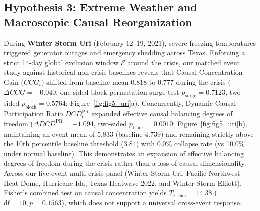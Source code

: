 \documentclass[10pt,twocolumn,journal]{article}
\begin{document}
\subsection{Hypothesis 3: Extreme Weather and Macroscopic Causal Reorganization}
During \textbf{Winter Storm Uri} (February 12--19, 2021), severe freezing temperatures triggered generator outages and emergency shedding across Texas. Enforcing a strict 14-day global exclusion window $\mathcal{E}$ around the crisis, our matched event study against historical non-crisis baselines reveals that Causal Concentration Gain ($CCG_t$) shifted from baseline mean $0.818$ to $0.777$ during the crisis ($\Delta CCG = -0.040$, one-sided block permutation surge test $p_{\text{surge}} = 0.7123$, two-sided $p_{\text{block}} = 0.5764$; Figure~\ref{fig:fig5_uri}a). Concurrently, Dynamic Causal Participation Ratio $DCD_t^{\text{PR}}$ expanded effective causal balancing degrees of freedom ($\Delta DCD^{\text{PR}} = +1.094$, two-sided $p_{\text{block}} = 0.0010$; Figure~\ref{fig:fig5_uri}b), maintaining an event mean of $5.833$ (baseline $4.739$) and remaining strictly above the 10th percentile baseline threshold ($3.84$) with 0.0\% collapse rate (vs 10.0\% under normal baseline). This demonstrates an expansion of effective balancing degrees of freedom during the crisis rather than a loss of causal dimensionality. Across our five-event multi-crisis panel (Winter Storm Uri, Pacific Northwest Heat Dome, Hurricane Ida, Texas Heatwave 2022, and Winter Storm Elliott), Fisher's combined test on causal concentration yields $T_{\text{Fisher}} = 14.38$ ($\text{df}=10, p = 0.1563$), which does not support a universal cross-event response.
\end{document}
